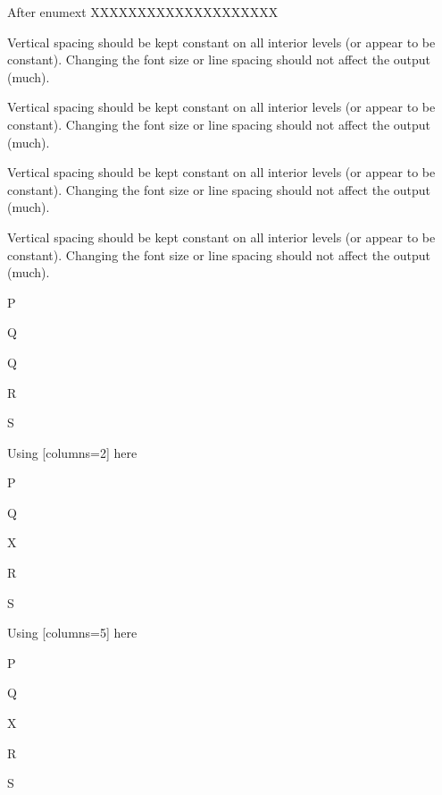 \documentclass[10pt]{article}
\begin{document}
After enumext XXXXXXXXXXXXXXXXXXXX




{}
\begin{enumext}[list-indent=3cm,listparindent=-1cm,list-offset=3cm,partopsep=0pt,itemsep=0pt,columns=1]%

\item Vertical spacing should be kept constant on all interior levels (or
appear to be constant). Changing the font size or line spacing should
not affect the output (much).

Vertical spacing should be kept constant on all interior levels (or
appear to be constant). Changing the font size or line spacing should
not affect the output (much).

Vertical spacing should be kept constant on all interior levels (or
appear to be constant). Changing the font size or line spacing should
not affect the output (much).

Vertical spacing should be kept constant on all interior levels (or
appear to be constant). Changing the font size or line spacing should
not affect the output (much).

  \begin{enumext}[columns=1]%
     \item  P \item Q \item Q  \item R \item S
  \end{enumext}

\item Using [columns=2] here

\begin{enumext}[columns=2]%
     \item  P \item Q \item X  \item R \item S
  \end{enumext}

\item Using [columns=5] here

\begin{enumext}[columns=5]%
     \item  P \item Q \item X  \item R \item S
  \end{enumext}


\end{enumext}
\end{document}
